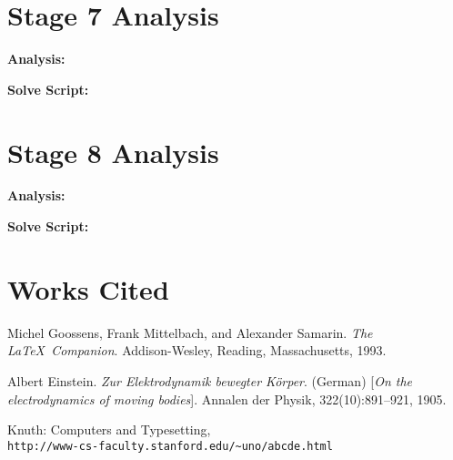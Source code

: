 \documentclass{article}
\begin{document}
\newpage
\section{Stage 7 Analysis}
\begin{flushleft}
\vspace{.5pc}
\end{flushleft}

\begin{flushleft}
\textbf{Analysis:}
\vspace{.5pc}
\end{flushleft}
\par

\begin{flushleft}
\textbf{Solve Script:}
\vspace{.5pc}
\end{flushleft}
\par

\newpage
\section{Stage 8 Analysis}
\begin{flushleft}
\vspace{.5pc}
\end{flushleft}

\begin{flushleft}
\textbf{Analysis:}
\vspace{.5pc}
\end{flushleft}
\par

\begin{flushleft}
\textbf{Solve Script:}
\vspace{.5pc}
\end{flushleft}
\par

\newpage
\section{Works Cited}
\begin{thebibliography}{9}
Michel Goossens, Frank Mittelbach, and Alexander Samarin. 
\textit{The \LaTeX\ Companion}. 
Addison-Wesley, Reading, Massachusetts, 1993.
 
Albert Einstein. 
\textit{Zur Elektrodynamik bewegter K{\"o}rper}. (German) 
[\textit{On the electrodynamics of moving bodies}]. 
Annalen der Physik, 322(10):891–921, 1905.
 
Knuth: Computers and Typesetting,
\\\texttt{http://www-cs-faculty.stanford.edu/\~{}uno/abcde.html}
\end{thebibliography}
\end{document}
